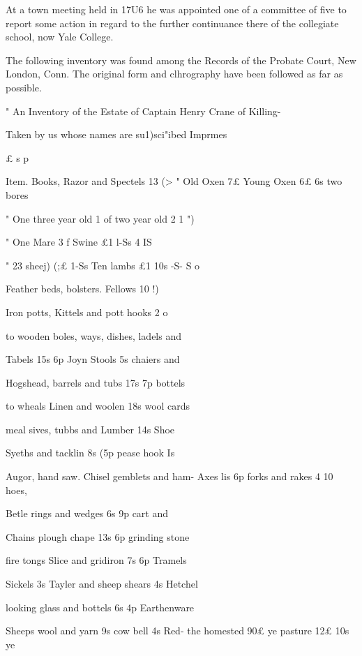\documentclass[oneside]{book}
\begin{document}
At a town meeting held in 17U6 he was appointed one of a 
committee of five to report some action in regard to the further 
continuance there of the collegiate school, now Yale College. 

The following inventory was found among the Records of the 
Probate Court, New London, Conn. The original form and 
clhrography have been followed as far as possible. 

" An Inventory of the Estate of Captain Henry Crane of Killing- 

Taken by us whose names are su1)sci"ibed 
Imprmes 

£ s p 


Item. Books, Razor and Spectels  13  (> 
" Old Oxen 7£ Young Oxen 6£  6s two bores 


" One three year old 1 of two year old 2  1 ")  

" One Mare 3 f Swine £1  l-Ss 4  IS  

" 23 sheej) (;£ 1-Ss Ten lambs £1 10s -S- S o 

Feather beds, bolsters. Fellows 10  !)  










Iron potts, Kittels and pott hooks 2  o  





to wooden boles, ways, dishes, ladels and 


Tabels 15s  6p Joyn Stools 5s chaiers and 

Hogshead, barrels and tubs 17s  7p bottels 



to wheals Linen and woolen 18s wool cards 

meal sives, tubbs and Lumber 14s Shoe 

Syeths and tacklin 8s  (5p pease hook Is 

Augor, hand saw. Chisel gemblets and ham- 
Axes lis  6p forks and rakes 4  10 hoes, 

Betle rings and wedges 6s  9p cart and 


Chains plough chape 13s  6p grinding stone 


fire tongs Slice and gridiron 7s  6p Tramels 

Sickels 3s Tayler and sheep shears 4s Hetchel 


looking glass and bottels 6s  4p Earthenware 

Sheeps wool and yarn 9s cow bell 4s Red- 
the homested 90£ ye pasture 12£  10s ye 
\end{document}
